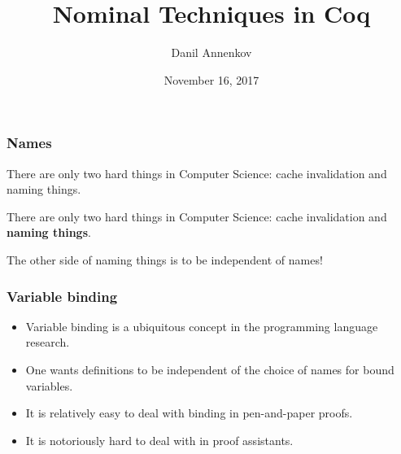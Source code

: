 \documentclass[10pt]{beamer}
\title{Nominal Techniques in Coq}
\author{Danil Annenkov}
\institute{University of Copenhagen, DIKU \\ HIPERFIT Workshop}
\date{November 16, 2017}
\begin{document}
\maketitle


\begin{frame}
  \frametitle{Names}
  \bigskip
  \begin{overlayarea}{\textwidth}{8cm}
   {\begin{exampleblock}{}
    \large{There are only two hard things in Computer Science: cache
    invalidation and naming things.}

    \vskip5mm
  \hspace*{}
  \end{exampleblock}}

   {\begin{exampleblock}{}
    \large{There are only two hard things in Computer Science: cache
      invalidation and \textbf{naming things}.}

    \vskip5mm
    \hspace*{}
  \end{exampleblock}

  \large{The other side of naming things is to be independent of names!}}
  \end{overlayarea}
\end{frame}

\begin{frame}
  \frametitle{Variable binding}
  \begin{itemize}
  \item Variable binding is a ubiquitous concept in the programming language research.
  \item One wants definitions to be independent of the choice of names
    for bound variables.
  \item It is relatively easy to deal with binding in pen-and-paper proofs.
  \item It is notoriously hard to deal with in proof assistants.
  \end{itemize}
\end{frame}
\end{document}
